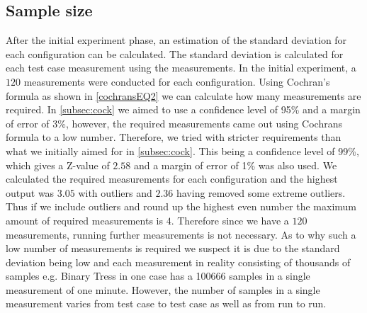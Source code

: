 \subsection{Sample size}
After the initial experiment phase, an estimation of the standard deviation for each configuration can be calculated. The standard deviation is calculated for each test case measurement using the measurements. In the initial experiment, a $120$ measurements were conducted for each configuration. Using Cochran's formula as shown in \cref{cochransEQ2} we can calculate how many measurements are required. In \cref{subsec:cock} we aimed to use a confidence level of 95\% and a margin of error of 3\%, however, the required measurements came out using Cochrans formula to a low number. Therefore, we tried with stricter requirements than what we initially aimed for in \cref{subsec:cock}. This being a confidence level of 99\%, which gives a Z-value of $2.58$ and a margin of error of 1\% was also used. We calculated the required measurements for each configuration and the highest output was $3.05$ with outliers and $2.36$ having removed some extreme outliers. Thus if we include outliers and round up the highest even number the maximum amount of required measurements is $4$. Therefore since we have a $120$ measurements, running further measurements is not necessary. As to why such a low number of measurements is required we suspect it is due to the standard deviation being low and each measurement in reality consisting of thousands of samples e.g. Binary Tress in one case has a 100666 samples in a single measurement of one minute. However, the number of samples in a single measurement varies from test case to test case as well as from run to run.


